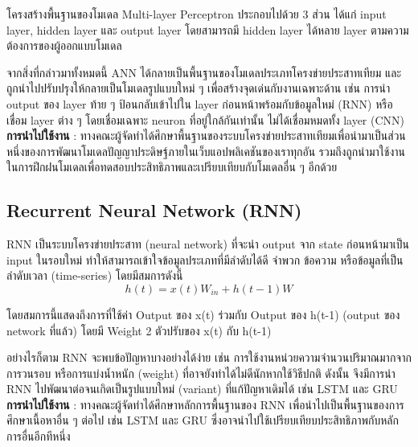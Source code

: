โครงสร้างพื้นฐานของโมเดล Multi-layer Perceptron ประกอบไปด้วย 3 ส่วน ได้แก่ input layer, hidden layer และ output layer โดยสามารถมี hidden layer ได้หลาย layer ตามความต้องการของผู้ออกแบบโมเดล

จากสิ่งที่กล่าวมาทั้งหมดนี้ ANN ได้กลายเป็นพื้นฐานของโมเดลประเภทโครงข่ายประสาทเทียม และถูกนำไปปรับปรุงให้กลายเป็นโมเดลรูปแบบใหม่ ๆ เพื่อสร้างจุดเด่นกับงานเฉพาะด้าน เช่น การนำ output ของ layer ท้าย ๆ ป้อนกลับเข้าไปใน layer ก่อนหน้าพร้อมกับข้อมูลใหม่ (RNN) หรือ เชื่อม layer ต่าง ๆ โดยเชื่อมเฉพาะ neuron ที่อยู่ใกล้กันเท่านั้น ไม่ได้เชื่อมหมดทั้ง layer (CNN)
\textbf{การนำไปใช้งาน} : ทางคณะผู้จัดทำได้ศึกษาพื้นฐานของระบบโครงข่ายประสาทเทียมเพื่อนำมาเป็นส่วนหนึ่งของการพัฒนาโมเดลปัญญาประดิษฐ์ภายในเว็บแอปพลิเคชันของเราทุกอัน รวมถึงถูกนำมาใช้งานในการฝึกฝนโมเดลเพื่อทดสอบประสิทธิภาพและเปรียบเทียบกับโมเดลอื่น ๆ อีกด้วย


\subsection{Recurrent Neural Network (RNN)}
RNN เป็นระบบโครงข่ายประสาท (neural network) ที่จะนำ output จาก state 
ก่อนหน้ามาเป็น input ในรอบใหม่ ทำให้สามารถเข้าใจข้อมูลประเภทที่มีลำดับได้ดี จำพวก 
ข้อความ หรือข้อมูลที่เป็นลำดับเวลา (time-series) โดยมีสมการดังนี้
    \[h(t) = x(t) W_{in} + h(t-1)W\]
\par โดยสมการนี้แสดงถึงการที่ใช้ค่า Output ของ x(t) ร่วมกับ Output ของ h(t-1) 
(output ของ network ที่แล้ว) โดยมี Weight 2 ตัวปรับของ x(t) กับ h(t-1)
\par อย่างไรก็ตาม RNN จะพบข้อปัญหาบางอย่างได้ง่าย เช่น 
การใช้งานหน่วยความจำนวนปริมาณมากจากการวนรอบ หรือการแบ่งน้ำหนัก (weight) 
ที่อาจยังทำได้ไม่ดีนักหากใช้วิธีปกติ ดังนั้น จึงมีการนำ RNN 
ไปพัฒนาต่อจนเกิดเป็นรูปแบบใหม่ (variant) ที่แก้ปัญหาเดิมได้ เช่น LSTM และ GRU \\
\textbf{การนำไปใช้งาน} : ทางคณะผู้จัดทำได้ศึกษาหลักการพื้นฐานของ RNN 
เพื่อนำไปเป็นพื้นฐานของการศึกษาเนื้อหาอื่น ๆ ต่อไป เช่น LSTM และ GRU 
ซึ่งอาจนำไปใช้เปรียบเทียบประสิทธิภาพกับหลักการอื่นอีกทีหนึ่ง
